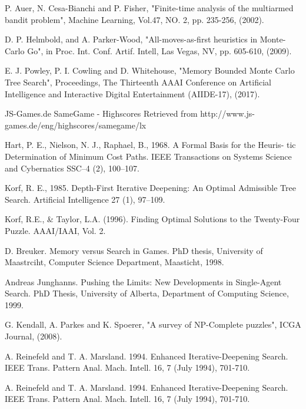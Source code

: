 \begin{thebibliography}{30}
P. Auer, N. Cesa-Bianchi and P. Fisher, "Finite-time analysis of the multiarmed bandit problem", Machine Learning, Vol.47, NO. 2, pp. 235-256, (2002).

D. P. Helmbold, and A. Parker-Wood, "All-moves-as-first heuristics in Monte-Carlo Go", in Proc. Int. Conf. Artif. Intell, Las Vegas, NV, pp. 605-610, (2009).

E. J. Powley, P. I. Cowling and D. Whitehouse, "Memory Bounded Monte Carlo Tree Search", Proceedings, The Thirteenth AAAI Conference on
Artificial Intelligence and Interactive Digital Entertainment (AIIDE-17), (2017).

JS-Games.de SameGame - Highscores Retrieved from http://www.js-games.de/eng/highscores/samegame/lx

Hart, P. E., Nielson, N. J., Raphael, B., 1968. A Formal Basis for the Heuris-
tic Determination of Minimum Cost Paths. IEEE Transactions on Systems
Science and Cybernatics SSC–4 (2), 100–107.

Korf, R. E., 1985. Depth-First Iterative Deepening: An Optimal Admissible
Tree Search. Artificial Intelligence 27 (1), 97–109.

Korf, R.E., \& Taylor, L.A. (1996). Finding Optimal Solutions to the Twenty-Four Puzzle. AAAI/IAAI, Vol. 2.

D. Breuker. Memory versus Search in Games. PhD thesis, University of Maastrciht, Computer Science Department, Maasticht, 1998.

Andreas Junghanns. Pushing the Limits: New Developments in Single-Agent Search. PhD Thesis, University of Alberta, Department of Computing Science, 1999.

G. Kendall, A. Parkes and K. Spoerer, "A survey of NP-Complete puzzles", ICGA Journal, (2008).

A. Reinefeld and T. A. Marsland. 1994. Enhanced Iterative-Deepening Search. IEEE Trans. Pattern Anal. Mach. Intell. 16, 7 (July 1994), 701-710. 

A. Reinefeld and T. A. Marsland. 1994. Enhanced Iterative-Deepening Search. IEEE Trans. Pattern Anal. Mach. Intell. 16, 7 (July 1994), 701-710.

\end{thebibliography}

